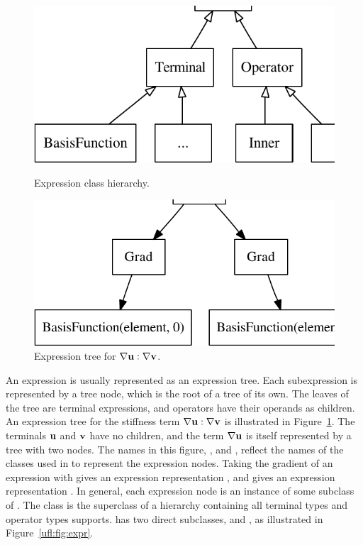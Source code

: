 \begin{figure}[t]
\begin{minipage}[b]{0.47\linewidth}
\centering
\includegraphics[width=1.0\largefig]{chapters/alnes-1/pdf/expr.pdf}
\caption{Expression class hierarchy.}
\label{ufl:fig:expr}
\end{minipage}
\hspace{0.73cm}
\begin{minipage}[b]{0.49\linewidth}
\centering
\includegraphics[width=\largefig]{chapters/alnes-1/pdf/stiffness.pdf}
\caption{Expression tree for $\nabla \mathbf{u} : \nabla \mathbf{v}$.}
\label{ufl:fig:stiffness}
\end{minipage}
\end{figure}
An expression is usually represented as an expression tree.  Each
subexpression is represented by a tree node, which is the root of a
tree of its own.  The leaves of the tree are terminal expressions, and
operators have their operands as children.  An expression tree for the
stiffness term $\nabla\mathbf{u} :\nabla\mathbf{v}$ is illustrated in
Figure~\ref{ufl:fig:stiffness}.  The terminals $\mathbf{u}$ and $\mathbf{v}$ have no
children, and the term $\nabla\mathbf{u}$ is itself represented by a tree
with two nodes.  The names in this figure, , 
and
, reflect the names of the classes used in \ufl{}
to represent the expression nodes. Taking the gradient of an
expression with  gives an expression representation
, and  gives an expression
representation .  In general, each expression node
is an instance of some subclass of .  The class
 is the superclass of a hierarchy containing all terminal
types and operator types \ufl{} supports.  has two direct
subclasses,
 and , as illustrated in
Figure~\ref{ufl:fig:expr}.

